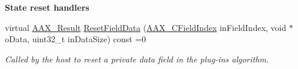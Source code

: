 \begin{Indent}\textbf{ State reset handlers}\par
\begin{DoxyCompactItemize}
\item 
virtual \mbox{\hyperlink{a00392_a4d8f69a697df7f70c3a8e9b8ee130d2f}{A\+A\+X\+\_\+\+Result}} \mbox{\hyperlink{a01669_a6e87e40d42c7431e52ae5ebd4f631964}{Reset\+Field\+Data}} (\mbox{\hyperlink{a00392_ae807f8986143820cfb5d6da32165c9c7}{A\+A\+X\+\_\+\+C\+Field\+Index}} in\+Field\+Index, void $\ast$o\+Data, uint32\+\_\+t in\+Data\+Size) const =0
\begin{DoxyCompactList}\small\item\em Called by the host to reset a private data field in the plug-\/in\textquotesingle{}s algorithm. \end{DoxyCompactList}\end{DoxyCompactItemize}
\end{Indent}
